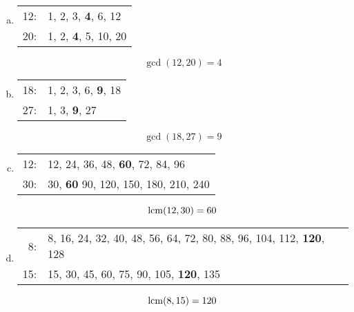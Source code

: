 \documentclass[11pt,letterpaper]{article}
\begin{document}
\sol
\begin{enumerate}[(a)]
\item \phantom{.}\par
	\begin{table}[!ht]
	\centering
	\begin{tabular}{rl}
	12: & 1, 2, 3, \textbf{4}, 6, 12 \\
	20: & 1, 2, \textbf{4}, 5, 10, 20 
	\end{tabular}
	\end{table}

	\[
	\gcd(12, 20)= 4 
	\] \pspace

\item \phantom{.}\par
	\begin{table}[!ht]
	\centering
	\begin{tabular}{rl}
	18: & 1, 2, 3, 6, \textbf{9}, 18 \\
	27: & 1, 3, \textbf{9}, 27
	\end{tabular}
	\end{table}

	\[
	\gcd(18, 27)= 9
	\] \pspace

\item \phantom{.}\par
	\begin{table}[!ht]
	\centering
	\begin{tabular}{rl}
	12: & 12, 24, 36, 48, \textbf{60}, 72, 84, 96 \\
	30: & 30, \textbf{60} 90, 120, 150, 180, 210, 240
	\end{tabular}
	\end{table}

	\[
	\operatorname{lcm}(12, 30)= 60 
	\] \pspace

\item \phantom{.}\par
	\begin{table}[!ht]
	\centering
	\begin{tabular}{rl}
	8: & 8, 16, 24, 32, 40, 48, 56, 64, 72, 80, 88, 96, 104, 112, \textbf{120}, 128 \\
	15: & 15, 30, 45, 60, 75, 90, 105, \textbf{120}, 135
	\end{tabular}
	\end{table}

	\[
	\operatorname{lcm}(8, 15)= 120
	\]
\end{enumerate}



\newpage
\end{document}
